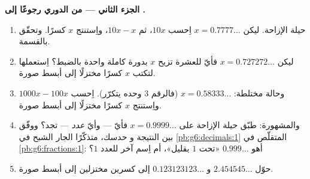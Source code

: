 \begin{problem}
\medskip
\noindent\textbf{الجزء الثاني --- من  الدوري رجوعًا إلى
.}
\begin{enumerate}[resume]
  \item حيلة الإزاحة. ليكن $x = 0.7777\ldots$ اِحسب $10x$،
        ثم $10x - x$، واِستنتج $x$ كسرًا. وتحقّق
        بالقسمة.
  \item ليكن $x = 0.727272\ldots$ فأيّ  للعشرة تزيح $x$ بدورة
        كاملة واحدة بالضبط؟ اِستعملها لتكتب $x$
        كسرًا مختزلًا إلى أبسط صورة.
  \item وحالة مختلطة: $x = 0.58333\ldots$ (فالرقم $3$ وحده
        يتكرّر). اِحسب $1000x - 100x$ واِستنتج $x$
        كسرًا مختزلًا إلى أبسط صورة.
  \item والمشهورة: طبّق حيلة الإزاحة على
        $x = 0.9999\ldots$ فأيّ  --- وأيّ \emph{عدد}
        --- تجد؟ ووفّق بين النتيجة و
        حدسك، متذكّرًا الجار الشبح في
        \cref{pb:g6:decimals:1}  المتقلّص في
        \cref{pb:g6:fractions:1}: أهو $0.999\ldots$ «تحت
        $1$ بقليل»، أم اِسم آخر للعدد $1$؟
  \item حوّل $2.454545\ldots$ و $0.123123123\ldots$ إلى
        كسرين مختزلين إلى أبسط صورة.
\end{enumerate}


\end{problem}
